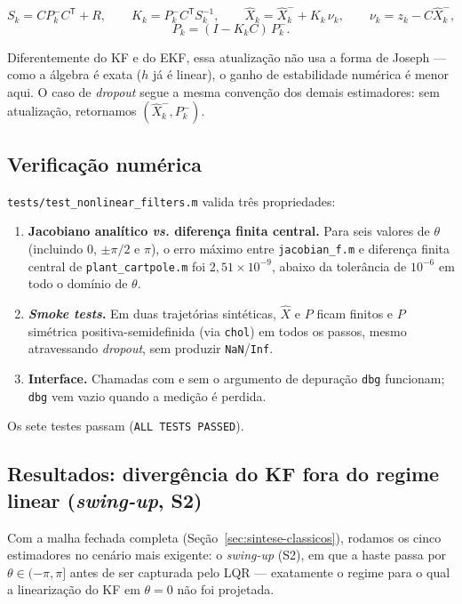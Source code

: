 \documentclass[brazil, 12pt]{article}
\begin{document}
\[
S_k = C P_k^{-} C^{\mathsf T} + R, \qquad
K_k = P_k^{-} C^{\mathsf T} S_k^{-1}, \qquad
\hat X_k = \hat X_k^{-} + K_k\,\nu_k, \qquad
\nu_k = z_k - C\hat X_k^{-},
\]
\[
P_k = (I-K_kC)\,P_k^{-}.
\]

Diferentemente do KF e do EKF, essa atualização não usa a forma de Joseph ---
como a álgebra é exata ($h$ já é linear), o ganho de estabilidade numérica é
menor aqui. O caso de \emph{dropout} segue a mesma convenção dos demais
estimadores: sem atualização, retornamos $(\hat X_k^{-},P_k^{-})$.

\subsection{Verificação numérica}
\label{sec:ekf-verificacao}

\texttt{tests/test\_nonlinear\_filters.m} valida três propriedades:

\begin{enumerate}
  \item \textbf{Jacobiano analítico \emph{vs.} diferença finita central.}
  Para seis valores de $\theta$ (incluindo $0$, $\pm\pi/2$ e $\pi$), o erro
  máximo entre \texttt{jacobian\_f.m} e diferença finita central de
  \texttt{plant\_cartpole.m} foi $2{,}51\times10^{-9}$, abaixo da tolerância
  de $10^{-6}$ em todo o domínio de $\theta$.
  \item \textbf{\emph{Smoke tests}.} Em duas trajetórias sintéticas, $\hat X$
  e $P$ ficam finitos e $P$ simétrica positiva-semidefinida (via
  \texttt{chol}) em todos os passos, mesmo atravessando \emph{dropout}, sem
  produzir \texttt{NaN}/\texttt{Inf}.
  \item \textbf{Interface.} Chamadas com e sem o argumento de depuração
  \texttt{dbg} funcionam; \texttt{dbg} vem vazio quando a medição é perdida.
\end{enumerate}

Os sete testes passam (\texttt{ALL TESTS PASSED}).

\subsection{Resultados: divergência do KF fora do regime linear (\emph{swing-up}, S2)}
\label{sec:resultados-naolineares}

Com a malha fechada completa (Seção~\ref{sec:sintese-classicos}), rodamos os
cinco estimadores no cenário mais exigente: o \emph{swing-up} (S2), em que a
haste passa por $\theta\in(-\pi,\pi]$ antes de ser capturada pelo LQR ---
exatamente o regime para o qual a linearização do KF em $\theta=0$ não foi
projetada.
\end{document}
